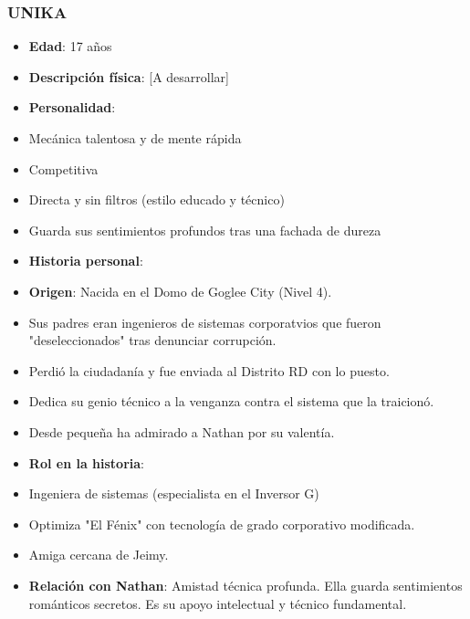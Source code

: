 \documentclass[11pt,a4paper]{report}
\begin{document}
\subsubsection{UNIKA}
\begin{itemize}
  \item \textbf{Edad}: 17 años
  \item \textbf{Descripción física}: [A desarrollar]
  \item \textbf{Personalidad}: 
  \item Mecánica talentosa y de mente rápida
  \item Competitiva
  \item Directa y sin filtros (estilo educado y técnico)
  \item Guarda sus sentimientos profundos tras una fachada de dureza
  \item \textbf{Historia personal}:
  \item \textbf{Origen}: Nacida en el Domo de Goglee City (Nivel 4).
  \item Sus padres eran ingenieros de sistemas corporatvios que fueron "deseleccionados" tras denunciar corrupción.
  \item Perdió la ciudadanía y fue enviada al Distrito RD con lo puesto.
  \item Dedica su genio técnico a la venganza contra el sistema que la traicionó.
  \item Desde pequeña ha admirado a Nathan por su valentía.
  \item \textbf{Rol en la historia}: 
  \item Ingeniera de sistemas (especialista en el Inversor G)
  \item Optimiza "El Fénix" con tecnología de grado corporativo modificada.
  \item Amiga cercana de Jeimy.
  \item \textbf{Relación con Nathan}: Amistad técnica profunda. Ella guarda sentimientos románticos secretos. Es su apoyo intelectual y técnico fundamental.

\end{itemize}
\end{document}
